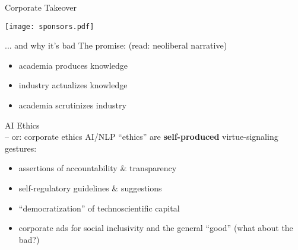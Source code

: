 \documentclass[aspectratio=169]{beamer}
\begin{document}
\begin{frame}{Corporate Takeover}
\begin{minipage}[t]{0.45\textwidth}
    \vfill
	\texttt{[image: sponsors.pdf]}
\end{minipage}\hfil%
\begin{minipage}[t]{0.45\textwidth}
    \vfill
\end{minipage}
\end{frame}


\begin{frame}{... and why it's bad}
	\smaller
	The promise: {\smaller \textcolor{gray!90}{(read: neoliberal narrative)}}
	\begin{itemize}
		\item academia produces knowledge
		\item industry actualizes knowledge
		\item academia scrutinizes industry	
	\end{itemize}
	
	\vfill

\end{frame}

\begin{frame}{AI Ethics\\
\quad \smaller -- or: corporate ethics}
	\smaller
	AI/NLP ``ethics'' are \textbf{self-produced} virtue-signaling gestures:
	\begin{itemize}
		\item assertions of accountability \& transparency
		\item self-regulatory guidelines \& suggestions
		\item ``democratization'' of technoscientific capital
		\item corporate ads for social inclusivity and the general ``good'' {\smaller \textcolor{gray!90}{(what about the bad?)}}
		\visible<2->{
		\item[\vdots]
		\item[\alert{\textbf{?}}] change course?
		}
	\end{itemize}
\end{frame}
\end{document}
